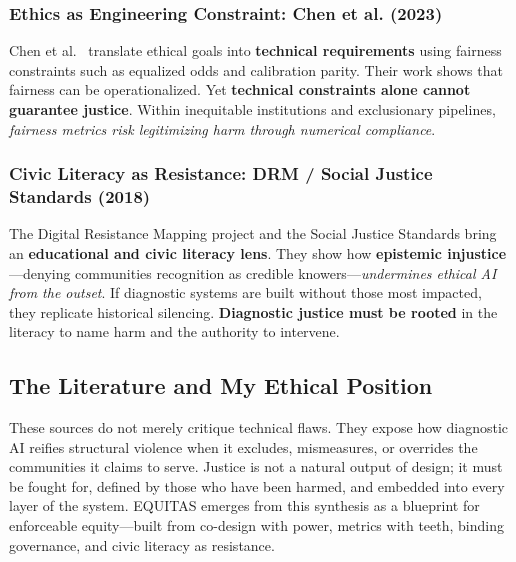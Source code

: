 \documentclass[12pt,a4paper]{article}
\begin{document}
\subsubsection{Ethics as Engineering Constraint: Chen et al. (2023)}
Chen et al.\ \citep{Chen2023} translate ethical goals into \textbf{technical requirements} using fairness constraints such as equalized odds and calibration parity. Their work shows that fairness can be operationalized. Yet \textbf{technical constraints alone cannot guarantee justice}. Within inequitable institutions and exclusionary pipelines, \textit{fairness metrics risk legitimizing harm through numerical compliance}.

\subsubsection{Civic Literacy as Resistance: DRM / Social Justice Standards (2018)}
The Digital Resistance Mapping project and the Social Justice Standards \citep{SocialJusticeStandards2018} bring an \textbf{educational and civic literacy lens}. They show how \textbf{epistemic injustice}—denying communities recognition as credible knowers—\textit{undermines ethical AI from the outset}. If diagnostic systems are built without those most impacted, they replicate historical silencing. \textbf{Diagnostic justice must be rooted} in the literacy to name harm and the authority to intervene.

\subsection{The Literature and My Ethical Position}
These sources do not merely critique technical flaws. They expose how diagnostic AI reifies structural violence when it excludes, mismeasures, or overrides the communities it claims to serve. Justice is not a natural output of design; it must be fought for, defined by those who have been harmed, and embedded into every layer of the system. EQUITAS emerges from this synthesis as a blueprint for enforceable equity—built from co-design with power, metrics with teeth, binding governance, and civic literacy as resistance.
\end{document}

